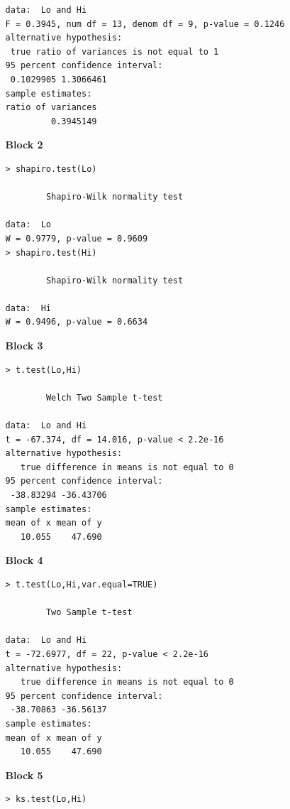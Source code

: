 \documentclass[a4paper,12pt]{article}
\begin{document}
\begin{itemize}
\begin{itemize}
\begin{framed}
\begin{verbatim}
data:  Lo and Hi
F = 0.3945, num df = 13, denom df = 9, p-value = 0.1246
alternative hypothesis: 
 true ratio of variances is not equal to 1
95 percent confidence interval:
 0.1029905 1.3066461
sample estimates:
ratio of variances 
         0.3945149
\end{verbatim}
\end{framed}

\item[\textbf{Block 2}]
\begin{framed}
\begin{verbatim}
> shapiro.test(Lo)

        Shapiro-Wilk normality test

data:  Lo
W = 0.9779, p-value = 0.9609
> shapiro.test(Hi)

        Shapiro-Wilk normality test

data:  Hi
W = 0.9496, p-value = 0.6634
\end{verbatim}
\end{framed}
\bigskip
\item[\textbf{Block 3}]
\begin{framed}
\begin{verbatim}
> t.test(Lo,Hi)

        Welch Two Sample t-test

data:  Lo and Hi
t = -67.374, df = 14.016, p-value < 2.2e-16
alternative hypothesis: 
   true difference in means is not equal to 0
95 percent confidence interval:
 -38.83294 -36.43706
sample estimates:
mean of x mean of y 
   10.055    47.690 
\end{verbatim}
\end{framed}
\newpage
\item[\textbf{Block 4}]
\begin{framed}
\begin{verbatim}
> t.test(Lo,Hi,var.equal=TRUE)

        Two Sample t-test

data:  Lo and Hi
t = -72.6977, df = 22, p-value < 2.2e-16
alternative hypothesis: 
   true difference in means is not equal to 0
95 percent confidence interval:
 -38.70863 -36.56137
sample estimates:
mean of x mean of y 
   10.055    47.690 

\end{verbatim}
\end{framed}



\item[\textbf{Block 5}]
\begin{framed}
\begin{verbatim}
> ks.test(Lo,Hi)


\end{verbatim}
\end{framed}
\end{itemize}
\end{itemize}
\end{document}
